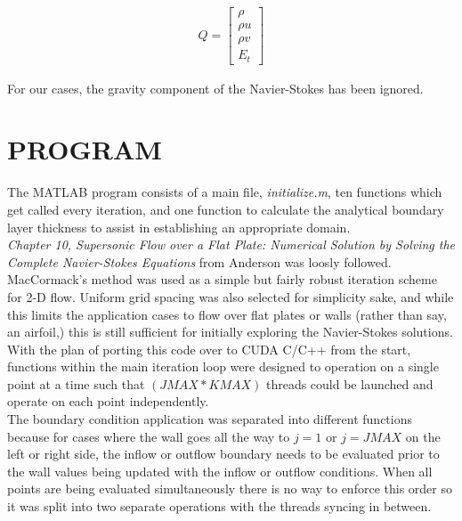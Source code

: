\documentclass[10pt,a4paper]{article}
\begin{document}
\begin{align*}
Q = 
\begin{bmatrix}
\rho \\
\rho u \\
\rho v \\
E_t
\end{bmatrix}
\end{align*}



For our cases, the gravity component of the Navier-Stokes has been ignored.\\





\section*{PROGRAM}

The MATLAB program consists of a main file, \textit{initialize.m}, ten functions which get called every iteration, and one function to calculate the analytical boundary layer thickness to assist in establishing an appropriate domain.\\

\textit{Chapter 10, Supersonic Flow over a Flat Plate: Numerical Solution by Solving the Complete Navier-Stokes Equations} from Anderson was loosly followed.\\

MacCormack's method was used as a simple but fairly robust iteration scheme for 2-D flow. Uniform grid spacing was also selected for simplicity sake, and while this limits the application cases to flow over flat plates or walls (rather than say, an airfoil,) this is still sufficient for initially exploring the Navier-Stokes solutions.\\

With the plan of porting this code over to CUDA C/C++ from the start, functions within the main iteration loop were designed to operation on a single point at a time such that $(JMAX*KMAX)$ threads could be launched and operate on each point independently.\\


The boundary condition application was separated into different functions because for cases where the wall goes all the way to $j=1$ or $j=JMAX$ on the left or right side, the inflow or outflow boundary needs to be evaluated prior to the wall values being updated with the inflow or outflow conditions. When all points are being evaluated simultaneously there is no way to enforce this order so it was split into two separate operations with the threads syncing in between.
\end{document}
